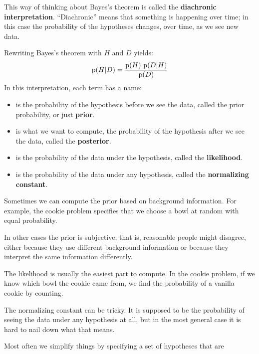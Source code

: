 \documentclass[12pt]{book}
\begin{document}
This way of thinking about Bayes's theorem is called the
{\bf diachronic interpretation}.  ``Diachronic'' means that something
is happening over time; in this case
the probability of the hypotheses changes, over time, as
we see new data.

Rewriting Bayes's theorem with $H$ and $D$ yields:
%
\[ \mathrm{p}(H|D) = \frac{\mathrm{p}(H)~\mathrm{p}(D|H)}{\mathrm{p}(D)} \]
%
In this interpretation, each term has a name:

\begin{itemize}

\item {} is the probability of the hypothesis before we see
the data, called the prior probability, or just {\bf prior}.

\item {} is what we want to compute, the probability of
the hypothesis after we see the data, called the {\bf posterior}.
 
\item {} is the probability of the data under the hypothesis,
called the {\bf likelihood}.

\item {} is the probability of the data under any hypothesis,
called the {\bf normalizing constant}.

\end{itemize}

Sometimes we can compute the prior based on background
information.  For example, the cookie problem specifies that we choose
a bowl at random with equal probability.

In other cases the prior is subjective; that is, reasonable people
might disagree, either because they use different background
information or because they interpret the same information
differently.

The likelihood is usually the easiest part to compute.  In the
cookie problem, if we know which bowl the cookie came from,
we find the probability of a vanilla cookie by counting.

The normalizing constant can be tricky.  It is supposed to be the
probability of seeing the data under any hypothesis at all, but in the
most general case it is hard to nail down what that means.

Most often we simplify things by specifying a set of hypotheses
that are
\end{document}
